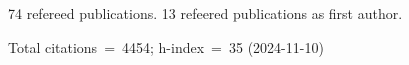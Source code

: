 74 refereed publications. 13 refeered publications as first author.

Total citations~=~4454; h-index~=~35 (2024-11-10)